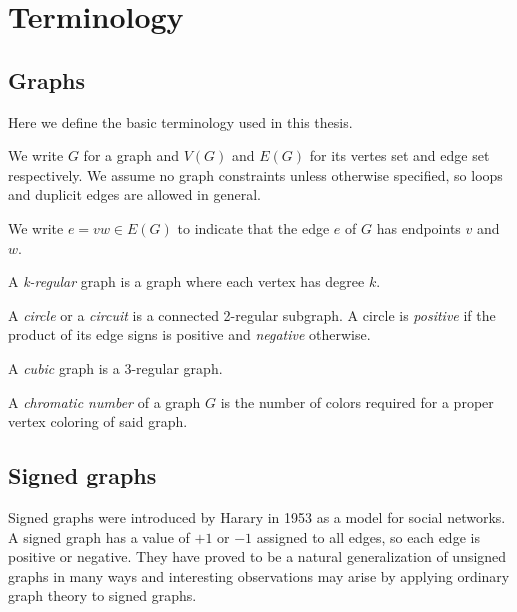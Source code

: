 \chapter{Terminology}\label{ch:preliminaries}

\section{Graphs}

Here we define the basic terminology used in this thesis.

\begin{definition}
    We write $G$ for a graph and $V(G)$ and $E(G)$ for its vertes set and edge set respectively.
    We assume no graph constraints unless otherwise specified, so loops and duplicit edges are allowed in general.
\end{definition}

\begin{definition}
    We write $e = vw \in E(G)$ to indicate that the edge $e$ of $G$ has endpoints $v$ and $w$.
\end{definition}

\begin{definition}
    A \textit{k-regular} graph is a graph where each vertex has degree $k$.
\end{definition}

\begin{definition}
    A \textit{circle} or a \textit{circuit} is a connected 2-regular subgraph.
    A circle is \textit{positive} if the product of its edge signs is positive and 
    \textit{negative} otherwise.
\end{definition}

\begin{definition}
    A \textit{cubic} graph is a 3-regular graph.
\end{definition}

\begin{definition}
    A \textit{chromatic number} of a graph $G$ is the number of colors required for a proper vertex coloring of said graph.
\end{definition}

\section{Signed graphs}

Signed graphs were introduced by Harary\cite{harary} in 1953 as a model for social networks. 
A signed graph has a value of $+1$ or $-1$ assigned to all edges, so each edge is positive or negative.
They have proved to be a natural generalization of unsigned graphs in many ways and interesting observations may arise
by applying ordinary graph theory to signed graphs.

